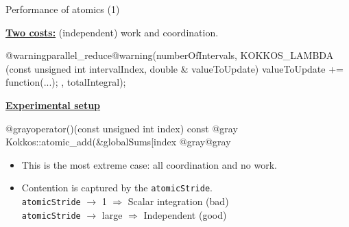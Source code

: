 
\begin{frame}[fragile]{Performance of atomics (1)}

  \ul{\textbf{Two costs:}} (independent) {\color{blue}work} and {\color{darkred}coordination}.

  \vspace{-5pt}

  \begin{code}[linebackgroundcolor={
        \btLstHL<1->{4}{blue!20}
      },
      keywords={}
    ]
@warningparallel_reduce@warning(numberOfIntervals,
  KOKKOS_LAMBDA (const unsigned int intervalIndex,
                 double & valueToUpdate) {
    valueToUpdate += function(...);
  }, totalIntegral);
  \end{code}

  \vspace{10pt}
  \pause

  \ul{\textbf{Experimental setup}}

  \begin{code}[linebackgroundcolor={
      },
      frame=single,
      keywords={}
    ]
@grayoperator()(const unsigned int index) const {@gray
  Kokkos::atomic_add(&globalSums[index %
@gray}@gray
  \end{code}

  \vspace{-5pt}

  \begin{itemize}
    \item{This is the most extreme case: {\color{darkred}all coordination} and {\color{darkred}no work}.}

    \item{Contention is captured by the \texttt{atomicStride}. \\
          \hspace{20pt}\texttt{atomicStride} $\rightarrow$ 1 \hspace{16pt}$\Rightarrow$ Scalar integration ({\color{darkred}bad}) \\
          \hspace{20pt}\texttt{atomicStride} $\rightarrow$ large $\Rightarrow$ Independent ({\color{darkgreen}good})
     }
  \end{itemize}

  \vspace{-15pt}

\end{frame}

